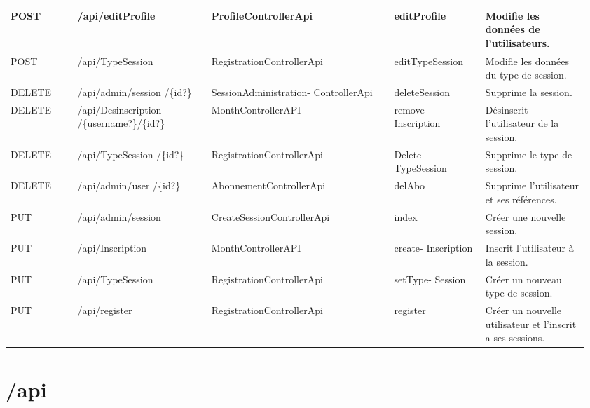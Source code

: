 		\newpage
			\begin{center}
				\begin{tabularx}{1.11\textwidth}{| T{0.11\linewidth} | S{0.22\linewidth} | S{0.3\linewidth} | S{0.151\linewidth} | S{0.175\linewidth} |}
					\hline
						POST & /api/editProfile & ProfileControllerApi & editProfile & Modifie les données de l'utilisateurs. \\
					\hline
						POST & /api/TypeSession & RegistrationControllerApi & editTypeSession & Modifie les données du type de session. \\
					\hline
					
					\hline
					
					\hline
						DELETE & /api/admin/session /\{id?\} & SessionAdministration- ControllerApi & deleteSession & Supprime la session. \\
					\hline
						DELETE & /api/Desinscription /\{username?\}/\{id?\} & MonthControllerAPI & remove- Inscription & Désinscrit l'utilisateur de la session. \\
					\hline
						DELETE & /api/TypeSession /\{id?\} & RegistrationControllerApi & Delete- TypeSession & Supprime le type de session. \\
					\hline
						DELETE & /api/admin/user /\{id?\} & AbonnementControllerApi & delAbo & Supprime l'utilisateur et ses références. \\
					\hline
			
					\hline
			
					\hline
						PUT & /api/admin/session & CreateSessionControllerApi & index & Créer une nouvelle session. \\
					\hline
						PUT & /api/Inscription & MonthControllerAPI & create- Inscription & Inscrit l'utilisateur à la session. \\
					\hline
						PUT & /api/TypeSession & RegistrationControllerApi & setType- Session & Créer un nouveau type de session. \\
					\hline
						PUT & /api/register & RegistrationControllerApi & register & Créer un nouvelle utilisateur et l'inscrit a ses sessions. \\
					\hline
				\end{tabularx}
			\end{center}


\vspace{\baselineskip}
\section{/api}
	
	


